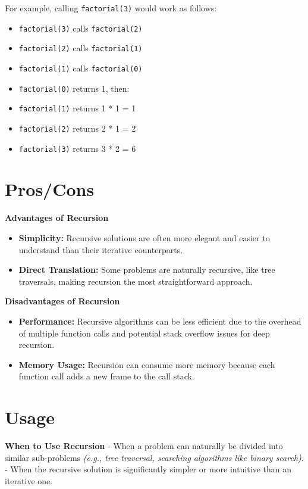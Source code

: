 \documentclass[
  letterpaper,
  DIV=11,
  numbers=noendperiod]{scrreprt}
\providecommand{\tightlist}{%
  \setlength{\itemsep}{0pt}\setlength{\parskip}{0pt}}
\begin{document}
For example, calling \texttt{factorial(3)} would work as follows:

\begin{itemize}
\tightlist
\item
  \texttt{factorial(3)} calls \texttt{factorial(2)}
\item
  \texttt{factorial(2)} calls \texttt{factorial(1)}
\item
  \texttt{factorial(1)} calls \texttt{factorial(0)}
\item
  \texttt{factorial(0)} returns 1, then:
\item
  \texttt{factorial(1)} returns 1 * 1 = 1
\item
  \texttt{factorial(2)} returns 2 * 1 = 2
\item
  \texttt{factorial(3)} returns 3 * 2 = 6
\end{itemize}

\section{Pros/Cons}

\textbf{Advantages of Recursion}

\begin{itemize}
\tightlist
\item
  \textbf{Simplicity:} Recursive solutions are often more elegant and
  easier to understand than their iterative counterparts.
\item
  \textbf{Direct Translation:} Some problems are naturally recursive,
  like tree traversals, making recursion the most straightforward
  approach.
\end{itemize}

\textbf{Disadvantages of Recursion}

\begin{itemize}
\tightlist
\item
  \textbf{Performance:} Recursive algorithms can be less efficient due
  to the overhead of multiple function calls and potential stack
  overflow issues for deep recursion.
\item
  \textbf{Memory Usage:} Recursion can consume more memory because each
  function call adds a new frame to the call stack.
\end{itemize}

\section{Usage}

\textbf{When to Use Recursion} - When a problem can naturally be divided
into similar sub-problems \emph{(e.g., tree traversal, searching
algorithms like binary search)}. - When the recursive solution is
significantly simpler or more intuitive than an iterative one.
\end{document}
